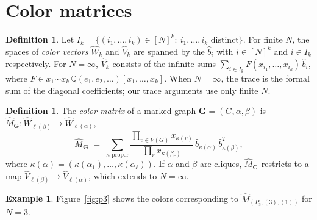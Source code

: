 \documentclass[12pt]{article}
\theoremstyle{plain}
\theoremstyle{definition}
\newtheorem{definition}[theorem]{Definition}
\newtheorem{example}[theorem]{Example}
\theoremstyle{remark}
\newcommand{\bQ}{\mathbb{Q}}
\newcommand{\bG}{\mathbf{G}}
\begin{document}
\section{Color matrices}\label{section:color}

\begin{definition}
Let $I_k=\{(i_1,\ldots,i_k)\in[N]^k:\ i_1,\ldots,i_k\text{ distinct}\}$. For finite $N$, the spaces of \emph{color vectors} $\hat W_k$ and $\hat V_k$ are spanned by the $\hat b_i$ with $i\in[N]^k$ and $i\in I_k$ respectively. For $N=\infty$, $\hat V_k$ consists of the infinite sums $\sum_{i\in I_k}F(x_{i_1},\dots,x_{i_k})\,\hat b_i$, where $F\in x_1\cdots x_k\,\bQ(e_1,e_2,\dots)[x_1,\dots,x_k]$. When $N=\infty$, the trace is the formal sum of the diagonal coefficients; our trace arguments use only finite $N$.
\end{definition}

\begin{definition}
The \emph{color matrix} of a marked graph $\bG=(G,\alpha,\beta)$ is $\hat M_\bG\colon\hat W_{\ell(\beta)}\to\hat W_{\ell(\alpha)}$,
\[
  \hat M_\bG \;=\; \sum_{\kappa\text{ proper}}
  \frac{\prod_{v\in V(G)} x_{\kappa(v)}}{\prod_{r} x_{\kappa(\beta_r)}}\,
  \hat b_{\kappa(\alpha)}\, \hat b_{\kappa(\beta)}^{T},
\]
where $\kappa(\alpha)=(\kappa(\alpha_1),\ldots,\kappa(\alpha_\ell))$. If $\alpha$ and $\beta$ are cliques, $\hat M_\bG$ restricts to a map $\hat V_{\ell(\beta)}\to\hat V_{\ell(\alpha)}$, which extends to $N=\infty$.
\end{definition}

\begin{example}
    Figure~\ref{fig:p3} shows the colors corresponding to $\hat M_{(P_3,(3),(1))}$ for $N=3$.
\end{example}
\end{document}
